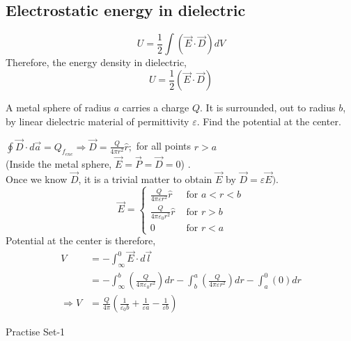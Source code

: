 \subsection{Electrostatic energy in dielectric}

$$
U=\frac{1}{2} \int(\vec{E} \cdot \vec{D}) d V
$$
Therefore, the energy density in dielectric, $$U=\frac{1}{2}(\vec{E} \cdot \vec{D})$$ 
\begin{exercise}
	 A metal sphere of radius $a$ carries a charge $Q .$ It is surrounded, out to radius $b$, by
	linear dielectric material of permittivity $\varepsilon$. Find the potential at the center.
\end{exercise} 
\begin{answer}
	 $\oint \vec{D} \cdot d \vec{a}=Q_{f_{e n c}} \Rightarrow \vec{D}=\frac{Q}{4 \pi r^{2}} \hat{r} ;$ for all points $r>a$\\
	(Inside the metal sphere, $\vec{E}=\vec{P}=\vec{D}=0$) . \\Once we know $\vec{D}$, it is a trivial matter to obtain
	$\vec{E}$ by $\vec{D}=\varepsilon \vec{E}) .$
	$$
	\vec{E}=\left\{\begin{array}{ll}
	\frac{Q}{4 \pi \varepsilon r^{2}} \hat{r} & \text { for } a<r<b \\
	\frac{Q}{4 \pi \varepsilon_{0} r^{2}} \hat{r} & \text { for } r>b \\
	0 & \text { for } r<a
	\end{array}\right.
	$$
	Potential at the center is therefore,
	\begin{align*}
	V&=-\int_{\infty}^{0} \vec{E} \cdot d \vec{l}\\&=-\int_{\infty}^{b}\left(\frac{Q}{4 \pi \varepsilon_{0} r^{2}}\right) d r-\int_{b}^{a}\left(\frac{Q}{4 \pi \varepsilon r^{2}}\right) d r-\int_{a}^{0}(0) d r \\\Rightarrow V&=\frac{Q}{4 \pi}\left(\frac{1}{\varepsilon_{0} b}+\frac{1}{\varepsilon a}-\frac{1}{\varepsilon b}\right)
	\end{align*}
	
\end{answer}
\newpage
\begin{abox}
Practise Set-1
\end{abox}
